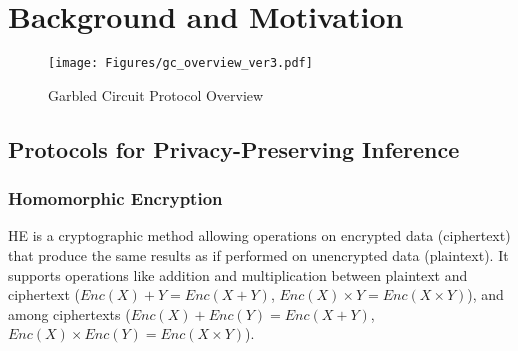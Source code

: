 \section{Background and Motivation}

\begin{figure}[t]
    \vspace{-0.2in}
    \centering
    \texttt{[image: Figures/gc\_overview\_ver3.pdf]}
    \caption{Garbled Circuit Protocol Overview}
    \vspace{-0.2in}
    \label{fig:garbled_circuit}
\end{figure}

\subsection{Protocols for Privacy-Preserving Inference}
\subsubsection{\textbf{Homomorphic Encryption}}
HE is a cryptographic method allowing operations on encrypted data (ciphertext) that produce the same results as if performed on unencrypted data (plaintext). It supports operations like addition and multiplication between plaintext and ciphertext ($Enc(X)+Y = Enc(X+Y)$, $Enc(X)\times Y = Enc(X\times Y)$), and among ciphertexts ($Enc(X)+Enc(Y) = Enc(X+Y)$, $Enc(X)\times Enc(Y) = Enc(X\times Y)$).



